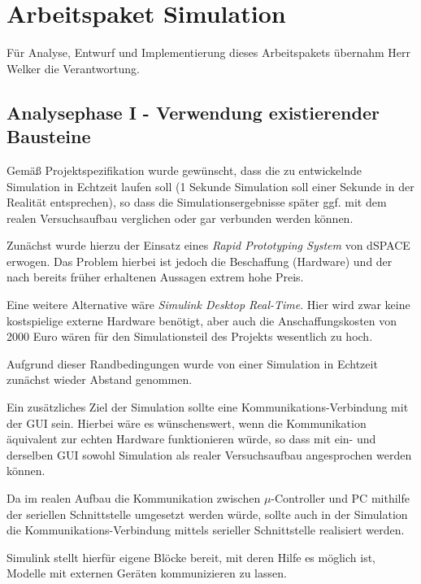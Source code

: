 
\chapter{Arbeitspaket Simulation}
Für Analyse, Entwurf und Implementierung dieses Arbeitspakets übernahm Herr Welker die Verantwortung.

\section{Analysephase I - Verwendung existierender Bausteine}
Gemäß Projektspezifikation wurde gewünscht, dass die zu entwickelnde Simulation in Echtzeit laufen soll (1 Sekunde Simulation soll einer Sekunde in der Realität entsprechen), so dass die Simulationsergebnisse später ggf. mit dem realen Versuchsaufbau verglichen oder gar verbunden werden können. 

Zunächst wurde hierzu der Einsatz eines \textit{Rapid Prototyping System} von dSPACE erwogen. %
Das Problem hierbei ist jedoch die Beschaffung (Hardware) und der nach bereits früher erhaltenen Aussagen extrem hohe Preis. 

Eine weitere Alternative wäre \textit{Simulink Desktop Real-Time}. %
Hier wird zwar keine kostspielige externe Hardware benötigt, aber auch die Anschaffungskosten von 2000 Euro %
wären für den Simulationsteil des Projekts wesentlich zu hoch. 

Aufgrund dieser Randbedingungen wurde von einer Simulation in Echtzeit zunächst wieder Abstand genommen.

Ein zusätzliches Ziel der Simulation sollte eine Kommunikations-Verbindung mit der GUI sein. Hierbei wäre es wünschenswert, wenn die Kommunikation äquivalent zur echten Hardware funktionieren würde, so dass mit ein- und derselben GUI sowohl Simulation als realer Versuchsaufbau angesprochen werden können. 

Da im realen Aufbau die Kommunikation zwischen $\mu$-Controller und PC mithilfe der seriellen Schnittstelle umgesetzt werden würde, sollte auch in der Simulation die Kommunikations-Verbindung mittels serieller Schnittstelle realisiert werden. 

Simulink stellt hierfür eigene Blöcke bereit, mit deren Hilfe es möglich ist, Modelle mit externen Geräten kommunizieren zu lassen.

